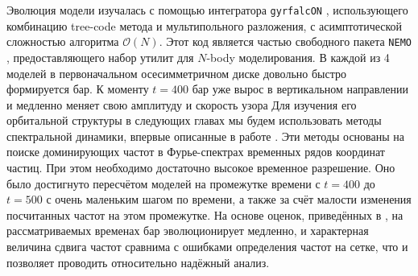 \documentclass{trlnotes}
\begin{document}
Эволюция модели изучалась с помощью интегратора \texttt{gyrfalcON} \cite{dehnen2002}, использующего комбинацию
tree-code метода и мультипольного разложения, с асимптотической сложностью алгоритма $\mathcal O(N)$. Этот код 
является частью свободного пакета \texttt{NEMO} \citep{teuben1995a}, предоставляющего набор утилит для $N$-body 
моделирования. В каждой из 4 моделей в первоначальном осесимметричном диске довольно быстро формируется бар. К моменту $t=400$ бар уже вырос в 
вертикальном направлении и медленно меняет свою амплитуду и скорость узора%
Для изучения его орбитальной структуры в следующих главах мы будем использовать методы спектральной динамики, впервые описанные в работе 
\citet{binney1982}. Эти методы основаны на поиске доминирующих частот в Фурье-спектрах временных рядов координат частиц. При этом необходимо 
достаточно высокое временное разрешение. Оно было достигнуто пересчётом моделей на промежутке времени с $t=400$ до $t=500$ с очень маленьким 
шагом по времени, а также за счёт малости изменения посчитанных частот на этом промежутке. На основе оценок, приведённых в \cite{parul2020}, на 
рассматриваемых временах бар эволюционирует медленно, и характерная величина сдвига частот сравнима с ошибками определения частот на сетке, что 
и позволяет проводить относительно надёжный анализ.
\end{document}
